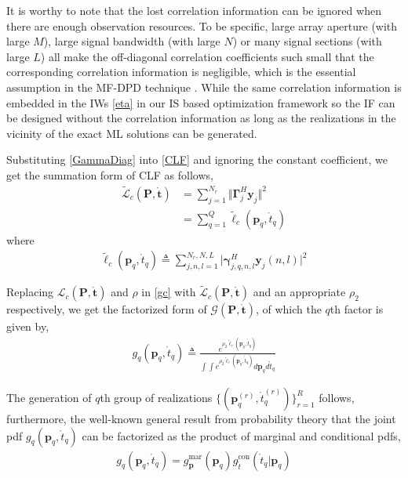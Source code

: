 \documentclass[review]{elsarticle}
\begin{document}
It is worthy to note that the lost correlation information can be ignored when there are enough observation resources. To be specific, large array aperture (with large $M$), large signal bandwidth (with large $N$) or many signal sections (with large $L$) all make the off-diagonal correlation coefficients such small that the corresponding correlation information is negligible, which is the essential assumption in the MF-DPD technique \cite{2004Direct}. While the same correlation information is embedded in the IWs \eqref{eta} in our IS based optimization framework so the IF can be designed without the correlation information as long as the realizations in the vicinity of the exact ML solutions can be generated.

Substituting \eqref{GammaDiag} into \eqref{CLF} and ignoring the constant coefficient, we get the summation form of CLF as follows,
\begin{align}\label{GLc}
    \tilde{\mathcal{L}}_c(\boldsymbol{P},\mathring{\boldsymbol{t}})&= \sum_{j=1}^{N_r}\Vert \boldsymbol{\Gamma}_{j}^H\boldsymbol{y}_j\Vert ^2\\
    &=\sum_{q=1}^Q \tilde{\ell}_c(\boldsymbol{p}_q,\mathring{t}_q)
\end{align}
where 
\begin{align}\label{glc}
    \tilde{\ell}_c(\boldsymbol{p}_q,\mathring{t}_q)\triangleq \sum_{j,n,l=1}^{N_r,N,L} \vert \boldsymbol{\gamma}_{j,q,n,l}^H\boldsymbol{y}_j(n,l)\vert ^2
\end{align}

Replacing $\mathcal{L}_c(\boldsymbol{P},\mathring{\boldsymbol{t}})$ and $\rho$ in \eqref{gc} with $\tilde{\mathcal{L}}_c(\boldsymbol{P},\mathring{\boldsymbol{t}})$ and an appropriate $\rho_2$ respectively, we get the factorized form of $\mathcal{G}(\boldsymbol{P},\mathring{\boldsymbol{t}})$, of which the $q$th factor is given by,
\begin{align}\label{gq}
    g_q(\boldsymbol{p}_q,\mathring{t}_q)\triangleq\frac{e^{\rho_2 \tilde{\ell}_c(\boldsymbol{p}_q,\mathring{t}_q)}}{\int\int e^{\rho_2 \tilde{\ell}_c(\boldsymbol{p}_q,\mathring{t}_q)}d\boldsymbol{p}_qd\mathring{t}_q }
\end{align}

The generation of $q$th group of realizations $\lbrace(\boldsymbol{p}_q^{(r)},\mathring{t}_q^{(r)})\rbrace_{r=1}^{R}$ follows, furthermore, the well-known general result from probability theory that the joint pdf $g_q(\boldsymbol{p}_q,\mathring{t}_q)$ can be factorized as the product of marginal and conditional pdfs,
\begin{align}\label{gppt}
    g_q(\boldsymbol{p}_q,\mathring{t}_q)=g_{\boldsymbol{p}}^{\text{mar}}(\boldsymbol{p}_q)g_{\mathring{t}}^{\text{con}}(\mathring{t}_q\vert \boldsymbol{p}_q)
\end{align}
\end{document}
